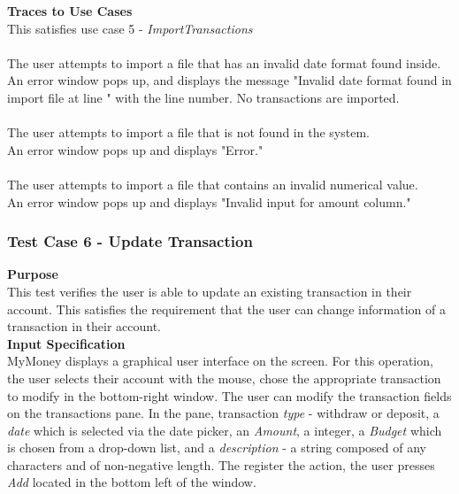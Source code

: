 \documentclass[12pt]{article}
\begin{document}
\noindent
{\bf Traces to Use Cases}\\
This satisfies use case 5 - \textit{ImportTransactions}\\

\\
The user attempts to import a file that has an invalid date format found inside.\\
An error window pops up, and displays the message "Invalid date format found in import file at line " with the line number. No transactions are imported.\\

\\
The user attempts to import a file that is not found in the system. \\
An error window pops up and displays "Error."\\

\\
The user attempts to import a file that contains an invalid numerical value.\\
An error window pops up and displays "Invalid input for amount column."

\clearpage

\subsubsection{Test Case 6 - Update Transaction} \label{TC-6}
\noindent
{\bf Purpose}\\
This test verifies the user is able to update an existing transaction in their account.
This satisfies the requirement that the user can change information of a transaction in their account.\\
                                                    
\noindent
{\bf Input Specification}\\
MyMoney displays a graphical user interface on the screen.
For this operation, the user selects their account with the mouse,
chose the appropriate transaction to modify in the bottom-right window.
The user can modify the transaction fields on the transactions pane.
In the pane, transaction \textit{type} - withdraw or deposit, a \textit{date}
which is selected via the date picker, an \textit{Amount}, a integer, a \textit{Budget} which is chosen
from a drop-down list, and a \textit{description} - a string composed of any characters and
of non-negative length. The register the action, the user presses \textit{Add} located in the bottom left
of the window. \\
                                                    
\end{document}
